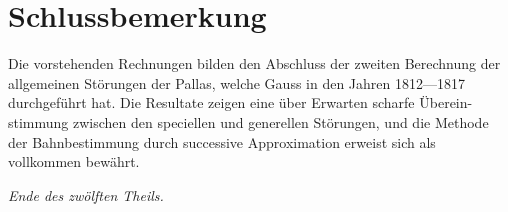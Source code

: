 \documentclass[10pt,a4paper]{article}
\begin{document}
\newpage
\section*{Schlussbemerkung}

Die vorstehenden Rechnungen bilden den Abschluss der zweiten Berechnung 
der allgemeinen Störungen der Pallas, welche Gauss in den Jahren 1812---1817 
durchgeführt hat. Die Resultate zeigen eine über Erwarten scharfe Überein-
stimmung zwischen den speciellen und generellen Störungen, und die Methode 
der Bahnbestimmung durch successive Approximation erweist sich als vollkommen 
bewährt.

\vspace{1cm}
\begin{flushright}
\textit{Ende des zwölften Theils.}
\end{flushright}
\end{document}
